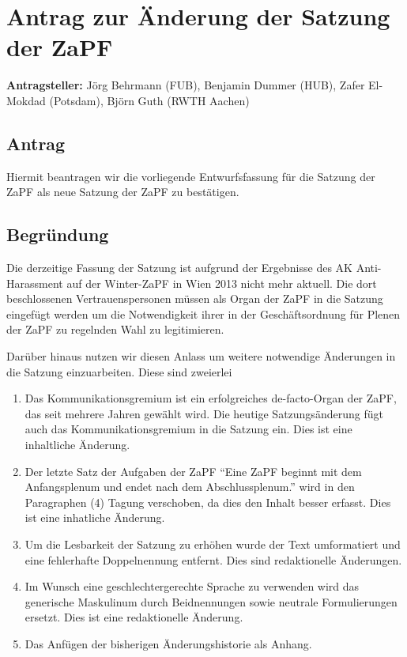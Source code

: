 \documentclass[draft,a4,12pt,oneside]{scrartcl}
\begin{document}
\section*{Antrag zur Änderung der Satzung der ZaPF}

\textbf{Antragsteller:} Jörg Behrmann (FUB), Benjamin Dummer (HUB), Zafer El-Mokdad (Potsdam), Björn Guth (RWTH Aachen)

\subsection*{Antrag}

Hiermit beantragen wir die vorliegende Entwurfsfassung für die Satzung der ZaPF als neue Satzung der ZaPF zu bestätigen.

\subsection*{Begründung}

Die derzeitige Fassung der Satzung ist aufgrund der Ergebnisse des AK Anti-Harassment auf der Winter-ZaPF in Wien
2013 nicht mehr aktuell. Die dort beschlossenen Vertrauenspersonen müssen als Organ der ZaPF in die Satzung eingefügt
werden um die Notwendigkeit ihrer in der Geschäftsordnung für Plenen der ZaPF zu regelnden Wahl zu legitimieren.

Darüber hinaus nutzen wir diesen Anlass um weitere notwendige Änderungen in die Satzung einzuarbeiten. Diese sind
zweierlei
\begin{enumerate}
\item Das Kommunikationsgremium ist ein erfolgreiches de-facto-Organ der ZaPF, das seit mehrere Jahren gewählt wird.
      Die heutige Satzungsänderung fügt auch das Kommunikationsgremium in die Satzung ein. Dies ist eine inhaltliche
      Änderung.
\item Der letzte Satz der Aufgaben der ZaPF ``Eine ZaPF beginnt mit dem Anfangsplenum und endet nach dem Abschlussplenum.''
      wird in den Paragraphen (4) Tagung verschoben, da dies den Inhalt besser erfasst. Dies ist eine inhatliche Änderung.
\item Um die Lesbarkeit der Satzung zu erhöhen wurde der Text umformatiert und eine fehlerhafte Doppelnennung entfernt.
      Dies sind redaktionelle Änderungen.
\item Im Wunsch eine geschlechtergerechte Sprache zu verwenden wird das generische Maskulinum durch Beidnennungen
      sowie neutrale Formulierungen ersetzt. Dies ist eine redaktionelle Änderung.
\item Das Anfügen der bisherigen Änderungshistorie als Anhang.
\end{enumerate}
\end{document}
